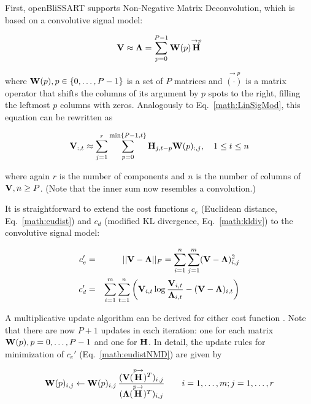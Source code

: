 First, openBliSSART supports Non-Negative Matrix Deconvolution, which is based
on a convolutive signal model:

\begin{equation}
    \label{math:NMDFact}
    \mathbf{V} \approx \mathbf{\Lambda} = \sum\limits_{p=0}^{P-1} 
                                    \mathbf{W}(p) \overset{\rightarrow p}{\mathbf{H}}
\end{equation}

\noindent where $\mathbf{W}(p), p \in \{0,\dots,P-1\}$ is a set of $P$ matrices and
$\overset{\rightarrow p}{(\cdot)}$ is a matrix operator that shifts the
columns of its argument by $p$ spots to the right, filling the leftmost $p$
columns with zeros. Analogously to Eq.~\ref{math:LinSigMod}, this equation can
be rewritten as

\begin{equation}
    \label{math:ConvSigMod}
    \mathbf{V}_{:,t} \approx \sum\limits_{j=1}^r \sum\limits_{p=0}^{\min\{P-1,t\}}
    \mathbf{H}_{j,t-p} \mathbf{W}(p)_{:,j}, \quad 1 \leq t \leq n
\end{equation}

\noindent where again $r$ is the number of components and $n$ is the number of
columns of $\mathbf{V}, n \geq P$. (Note that the inner sum now resembles a
convolution.)

It is straightforward to extend the cost functions $c_e$ (Euclidean distance,
Eq.~\ref{math:eudist}) and $c_d$ (modified KL divergence, Eq.~\ref{math:kldiv})
to the convolutive signal model:

\begin{eqnarray}
    \label{math:eudistNMD}
    c_e' &=& ||\mathbf{V}-\mathbf{\Lambda}||_F = \sum\limits_{i=1}^n \sum\limits_{j=1}^m (\mathbf{V}-\mathbf{\Lambda})_{i,j}^2\\
    \label{math:kldivNMD}
    c_d' &=& \sum\limits_{i=1}^m \sum\limits_{t=1}^n
    \left( \mathbf{V}_{i,t} \log\frac{\mathbf{V}_{i,t}}{\mathbf{\Lambda}_{i,t}} - 
    (\mathbf{V} - \mathbf{\Lambda})_{i,t} \right)
\end{eqnarray}

A multiplicative update algorithm can be derived for either cost function
\cite{Smaragdis2004,WangNMD2009}. Note that there are now $P+1$ updates in each
iteration: one for each matrix $\mathbf{W}(p), p = 0, \dots, P-1$ and one for
$\mathbf{H}$. In detail, the update rules for minimization of $c_e'$
(Eq.~\ref{math:eudistNMD}) are given by

\begin{equation}
    \label{math:EDWUpdateRuleNMD}
    \mathbf{W}(p)_{i,j} \leftarrow \mathbf{W}(p)_{i,j} \,
    \frac{( \mathbf{V}(\overset{p\rightarrow}{\mathbf{H}})^T )_{i,j}}
         {( \mathbf{\Lambda}(\overset{p\rightarrow}{\mathbf{H}})^T )_{i,j}}
    \qquad
     i = 1, \dots, m; j = 1, \dots, r
\end{equation}

